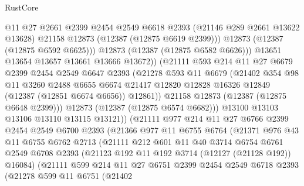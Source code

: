 \begin{lexlean}{RustCore}
\begin{coremodule}
                      @11
                      @27
                      @2661
                      @2399
                      @2454
                      @2549
                      @6618
                      @2393
                      (@21146 @289 @2661 @13622 @13628)
                      @21158
                      @12873
                      (@12387 (@12875 @6619 @2399)))
                    @12873
                    (@12387 (@12875 @6592 @6625)))
                  @12873
                  (@12387 (@12875 @6582 @6626)))
                @13651
                @13654
                @13657
                @13661
                @13666
                @13672))
            (@21111
              @593
              @214
              @11
              @27
              @6679
              @2399
              @2454
              @2549
              @6647
              @2393
              (@21278
                @593
                @11
                @6679
                (@21402
                  @354
                  @98
                  @11
                  @3260
                  @2488
                  @6655
                  @6674
                  @21417
                  @12820
                  @12828
                  @16326
                  @12849
                  (@12387 (@12851 @6674 @6656))
                  @12861))
              @21158
              @12873
              (@12387 (@12875 @6648 @2399)))
            @12873
            (@12387 (@12875 @6574 @6682)))
          @13100
          @13103
          @13106
          @13110
          @13115
          @13121))
      (@21111
        @977
        @214
        @11
        @27
        @6766
        @2399
        @2454
        @2549
        @6700
        @2393
        (@21366
          @977
          @11
          @6755
          @6764
          (@21371
            @976
            @43
            @11
            @6755
            @6762
            @2713
            (@21111
              @212
              @601
              @11
              @40
              @3714
              @6754
              @6761
              @2549
              @6708
              @2393
              (@21123 @192 @11 @192 @3714 (@12127 (@21128 @192)) @16084)
              (@21111
                @599
                @214
                @11
                @27
                @6751
                @2399
                @2454
                @2549
                @6718
                @2393
                (@21278
                  @599
                  @11
                  @6751
                  (@21402

\end{coremodule}
\end{lexlean}
